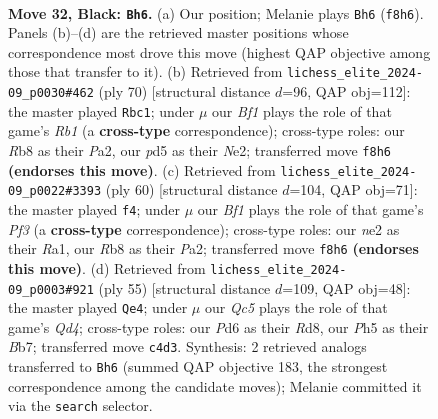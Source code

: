 \documentclass[11pt]{article}
\begin{document}
\clearpage

\begin{figure}[p]\centering
\begin{subfigure}{0.46\textwidth}\centering
\resizebox{\linewidth}{!}{%
\newchessgame
\chessboard[
  setfen={1r3b2/n3rk2/p2p2p1/3P3p/Rpq1p2P/4R3/1Q1BNPP1/5K2 b - - 0 32},
  showmover=false,
  pgfstyle=straightmove, color=movearrow, markmove={f8-h6}
]}
\caption{}
\end{subfigure}\hfill
\begin{subfigure}{0.46\textwidth}\centering
\resizebox{\linewidth}{!}{%
\newchessgame
\chessboard[
  setfen={2b5/b1q1rpk1/P4pp1/1BPr4/7p/2Q4P/P3NPP1/1R3RK1 w - - 1 36},
  showmover=false,
  pgfstyle=straightmove, color=movearrow, markmove={b1-c1}
]}
\caption{}
\end{subfigure}
\\[4pt]
\begin{subfigure}{0.46\textwidth}\centering
\resizebox{\linewidth}{!}{%
\newchessgame
\chessboard[
  setfen={2k2r1r/pp3P2/2p3q1/2p3P1/2Pb4/3P1P2/P1P1Q1RB/R6K w - - 1 31},
  showmover=false,
  pgfstyle=straightmove, color=movearrow, markmove={f3-f4}
]}
\caption{}
\end{subfigure}\hfill
\begin{subfigure}{0.46\textwidth}\centering
\resizebox{\linewidth}{!}{%
\newchessgame
\chessboard[
  setfen={3r2r1/1bp1R2p/p4pkB/1p1q1p2/3P4/3Q4/PP3RPP/6K1 b - - 4 28},
  showmover=false,
  pgfstyle=straightmove, color=movearrow, markmove={d5-e4}
]}
\caption{}
\end{subfigure}
\caption{\textbf{Move 32, Black: \texttt{Bh6}.} (a) Our position; Melanie plays \texttt{Bh6} (\texttt{f8h6}). Panels (b)--(d) are the retrieved master positions whose correspondence most drove this move (highest QAP objective among those that transfer to it). (b) Retrieved from \texttt{lichess\_elite\_2024-09\_p0030\#462} (ply 70) [structural distance $d$=96, QAP obj=112]: the master played \texttt{Rbc1}; under $\mu$ our \emph{Bf1} plays the role of that game's \emph{Rb1} (a \textbf{cross-type} correspondence); cross-type roles: our \emph{R}b8 as their \emph{P}a2, our \emph{p}d5 as their \emph{N}e2; transferred move \texttt{f8h6} \textbf{(endorses this move)}. (c) Retrieved from \texttt{lichess\_elite\_2024-09\_p0022\#3393} (ply 60) [structural distance $d$=104, QAP obj=71]: the master played \texttt{f4}; under $\mu$ our \emph{Bf1} plays the role of that game's \emph{Pf3} (a \textbf{cross-type} correspondence); cross-type roles: our \emph{n}e2 as their \emph{R}a1, our \emph{R}b8 as their \emph{P}a2; transferred move \texttt{f8h6} \textbf{(endorses this move)}. (d) Retrieved from \texttt{lichess\_elite\_2024-09\_p0003\#921} (ply 55) [structural distance $d$=109, QAP obj=48]: the master played \texttt{Qe4}; under $\mu$ our \emph{Qc5} plays the role of that game's \emph{Qd4}; cross-type roles: our \emph{P}d6 as their \emph{R}d8, our \emph{P}h5 as their \emph{B}b7; transferred move \texttt{c4d3}. Synthesis: 2 retrieved analogs transferred to \texttt{Bh6} (summed QAP objective 183, the strongest correspondence among the candidate moves); Melanie committed it via the \texttt{search} selector.}
\label{fig:thought-m63}
\end{figure}
\end{document}
